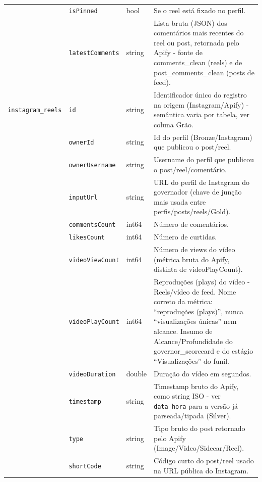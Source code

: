 \begin{footnotesize}
\begin{longtable}{p{3.2cm}p{3.0cm}p{2.0cm}p{6.0cm}}
\texttt{} & \texttt{isPinned} & bool & Se o reel está fixado no perfil. \\
\texttt{} & \texttt{latestComments} & string & Lista bruta (JSON) dos comentários mais recentes do reel ou post, retornada pelo Apify - fonte de comments\_\allowbreak{}clean (reels) e de post\_\allowbreak{}comments\_\allowbreak{}clean (posts de feed). \\
\texttt{instagram\_\allowbreak{}reels} & \texttt{id} & string & Identificador único do registro na origem (Instagram/\allowbreak{}Apify) - semântica varia por tabela, ver coluna Grão. \\
\texttt{} & \texttt{ownerId} & string & Id do perfil (Bronze/\allowbreak{}Instagram) que publicou o post/\allowbreak{}reel. \\
\texttt{} & \texttt{ownerUsername} & string & Username do perfil que publicou o post/\allowbreak{}reel/\allowbreak{}comentário. \\
\texttt{} & \texttt{inputUrl} & string & URL do perfil de Instagram do governador (chave de junção mais usada entre perfis/\allowbreak{}posts/\allowbreak{}reels/\allowbreak{}Gold). \\
\texttt{} & \texttt{commentsCount} & int64 & Número de comentários. \\
\texttt{} & \texttt{likesCount} & int64 & Número de curtidas. \\
\texttt{} & \texttt{videoViewCount} & int64 & Número de views do vídeo (métrica bruta do Apify, distinta de videoPlayCount). \\
\texttt{} & \texttt{videoPlayCount} & int64 & Reproduções (plays) do vídeo - Reels/\allowbreak{}vídeo de feed. Nome correto da métrica: ``reproduções (plays)'', nunca ``visualizações únicas'' nem alcance. Insumo de Alcance/\allowbreak{}Profundidade do governor\_\allowbreak{}scorecard e do estágio ``Visualizações'' do funil. \\
\texttt{} & \texttt{videoDuration} & double & Duração do vídeo em segundos. \\
\texttt{} & \texttt{timestamp} & string & Timestamp bruto do Apify, como string ISO - ver \texttt{data\_\allowbreak{}hora} para a versão já parseada/\allowbreak{}tipada (Silver). \\
\texttt{} & \texttt{type} & string & Tipo bruto do post retornado pelo Apify (Image/\allowbreak{}Video/\allowbreak{}Sidecar/\allowbreak{}Reel). \\
\texttt{} & \texttt{shortCode} & string & Código curto do post/\allowbreak{}reel usado na URL pública do Instagram. \\

\end{longtable}
\end{footnotesize}
